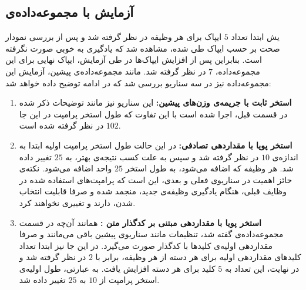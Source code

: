 \subsection{آزمایش با مجموعه‌داده‌ی }
یش ابتدا تعداد $5$ ایپاک برای هر وظیفه در نظر گرفته شد و پس از بررسی نمودار صحت بر حسب ایپاک طی شده، مشاهده شد که یادگیری به خوبی صورت نگرفته است. بنابراین پس از افزایش ایپاک‌ها در طی آزمایش، ایپاک نهایی برای این مجموعه‌داده، $7$ در نظر گرفته شد. مانند مجموعه‌داده‌ی پیشین، آزمایش این مجموعه‌داده نیز در سه سناریو بررسی شد که در ادامه توضیح داده خواهد شد: 
\begin{enumerate}
	\item \textbf{استخر ثابت با جریمه‌ی وزن‌های پیشین:} 
	این سناریو نیز مانند توضیحات ذکر شده در قسمت قبل، اجرا شده است با این تفاوت که طول استخر پرامپت در این جا $102$ در نظر گرفته شده است.   
	\item \textbf{استخر پویا با مقداردهی تصادفی:}
	در این حالت طول استخر پرامپت اولیه ابتدا به اندازه‌ی $10$ در نظر گرفته شد و سپس به علت کسب نتیجه‌ی بهتر، به $25$ تغییر داده شد. هر وظیفه‌‌ که اضافه می‌شود، به طول استخر $25$ واحد اضافه می‌شود. نکته‌ی حائز اهمیت در سناریوی فعلی و بعدی، این است که پرامپت‌های استفاده شده در وظایف قبلی، هنگام یادگیری وظیفه‌ی جدید، منجمد شده و صرفا قابلیت انتخاب شدن، دارند و تغییری نخواهند کرد. 
	\item \textbf{استخر پویا با مقداردهی مبتنی بر کدگذار متن :}
	همانند آن‌چه در قسمت مجموعه‌داده‌ی  گفته شد، تنظیمات مانند سناریوی پیشین باقی می‌مانند و صرفا مقداردهی اولیه‌ی کلیدها با کدگذار  صورت می‌گیرد. در این جا نیز ابتدا تعداد کلیدهای مقداردهی اولیه برای هر دسته از هر وظیفه‌، برابر با $2$ در نظر گرفته شد و در نهایت، این تعداد به $5$ کلید برای هر دسته افزایش یافت. به عبارتی، طول اولیه‌ی استخر پرامپت از $10$ به $25$ تغییر داده شد. 
\end{enumerate}



